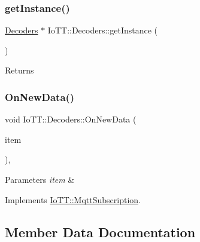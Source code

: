 \subsubsection{\texorpdfstring{get\+Instance()}{getInstance()}}
{\footnotesize\ttfamily \hyperlink{classIoTT_1_1Decoders}{Decoders} $\ast$ Io\+T\+T\+::\+Decoders\+::get\+Instance (\begin{DoxyParamCaption}{ }\end{DoxyParamCaption})\hspace{0.3cm}{\ttfamily [static]}}

\begin{DoxyReturn}{Returns}

\end{DoxyReturn}
\mbox{\label{classIoTT_1_1Decoders_aa413a310e8ba87b11d3a7c2b02a90dc4}} 
\subsubsection{\texorpdfstring{On\+New\+Data()}{OnNewData()}}
{\footnotesize\ttfamily void Io\+T\+T\+::\+Decoders\+::\+On\+New\+Data (\begin{DoxyParamCaption}\item[{const \hyperlink{classIoTT_1_1mqttMessageQueueItem}{mqtt\+Message\+Queue\+Item} \&}]{item }\end{DoxyParamCaption})\hspace{0.3cm}{\ttfamily [override]}, {\ttfamily [virtual]}}


\begin{DoxyParams}{Parameters}
{\em item} & \\
\hline
\end{DoxyParams}


Implements \hyperlink{classIoTT_1_1MqttSubscription_a9ddc697ad6a842bd88ec0e768d8a1d37}{Io\+T\+T\+::\+Mqtt\+Subscription}.



\subsection{Member Data Documentation}
\mbox{\label{classIoTT_1_1Decoders_afa68af31e406b2de6877715f16d6833f}} 
